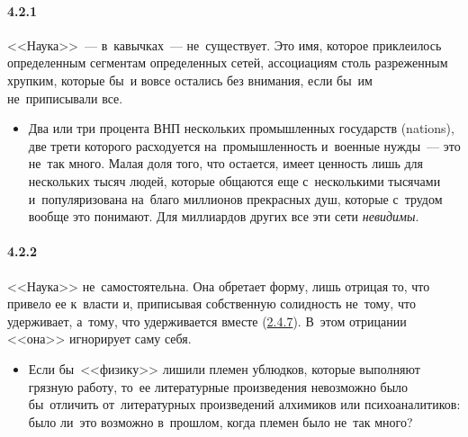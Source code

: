 \paragraph{4.2.1}\hypertarget{par:4.2.1}{} <<Наука>>~--- в~кавычках~--- не~существует. Это имя, которое приклеилось определенным сегментам определенных сетей, ассоциациям столь разреженным хрупким, которые бы~и вовсе остались без внимания, если бы~им не~приписывали все. 
	\begin{itemize}
	\item 
	Два или три процента ВНП нескольких промышленных государств (nations), две трети которого расходуется на~промышленность и~военные нужды~--- это не~так много. Малая доля того, что остается, имеет ценность лишь для нескольких тысяч людей, которые общаются еще с~несколькими тысячами и~популяризована на~благо миллионов прекрасных душ, которые с~трудом вообще это понимают. Для миллиардов других все эти сети {\itshape невидимы}.
	\end{itemize}	

\paragraph{4.2.2}\hypertarget{par:4.2.2}{} <<Наука>> не~самостоятельна. Она обретает форму, лишь отрицая то, что привело ее к~власти и, приписывая собственную солидность не~тому, что удерживает, а~тому, что удерживается вместе (\hyperlink{par:2.4.7}{2.4.7}). В~этом отрицании <<она>> игнорирует саму себя.
	\begin{itemize}
	\item 
	Если бы~<<физику>> лишили племен ублюдков, которые выполняют грязную работу, то~ее литературные произведения невозможно было бы~отличить от~литературных произведений алхимиков или психоаналитиков: было ли~это возможно в~прошлом, когда племен было не~так много?
	\end{itemize}	


